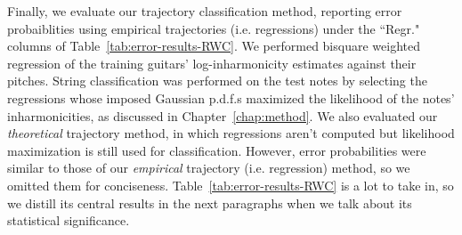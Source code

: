 \documentclass[12pt]{cmuthesis}
\begin{document}
Finally, we evaluate our trajectory classification method, reporting error probaiblities using empirical trajectories (i.e. regressions) under the ``Regr." columns of Table~\ref{tab:error-results-RWC}. We performed bisquare weighted regression of the training guitars' log-inharmonicity estimates against their pitches. String classification was performed on the test notes by selecting the regressions whose imposed Gaussian p.d.f.s maximized the likelihood of the notes' inharmonicities, as discussed in Chapter~\ref{chap:method}. We also evaluated our \textit{theoretical} trajectory method, in which regressions aren't computed but likelihood maximization is still used for classification. However, error probabilities were similar to those of our \textit{empirical} trajectory (i.e. regression) method, so we omitted them for conciseness. Table~\ref{tab:error-results-RWC} is a lot to take in, so we distill its central results in the next paragraphs when we talk about its statistical significance.
\end{document}
